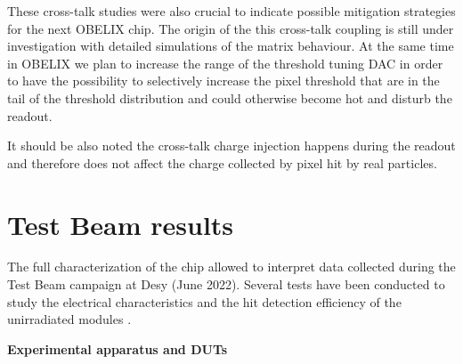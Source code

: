 These cross-talk studies were also crucial to indicate possible mitigation strategies for the next OBELIX chip. 
The origin of the this cross-talk coupling is still under investigation with detailed simulations of the matrix behaviour. At the same time in OBELIX we plan to increase the range of the threshold tuning DAC in order to have the possibility to selectively increase the pixel threshold that are in the tail of the threshold distribution and could otherwise become hot and disturb the readout. 

It should be also noted the cross-talk charge injection happens during the readout and therefore does not affect the charge collected by pixel hit by real particles.




\begin{comment}
Suggestions from OBELIX meeting.

Probably the coupling is linked to digital power. 
Not from the bulk: +4 clk seems to be the indication for not a direct coupling

Since the distribution of the power is from the edge,  first and last column should be more solid against this effect and hot pixel should be more present in the center? 
They asked if we have a  map of the hot pixels

Also suggested to change the clock and see if the delay from the FREEZE edge is at the same delay or not. 

\end{comment}




\section{Test Beam results}

The full characterization of the chip allowed to interpret data collected during the Test Beam campaign at Desy (June 2022). Several tests have been conducted to study the electrical characteristics and the hit detection efficiency of the unirradiated modules \cite{Bespin:2023vyw}.

\bigskip

\textbf{Experimental apparatus and DUTs}

\medskip


